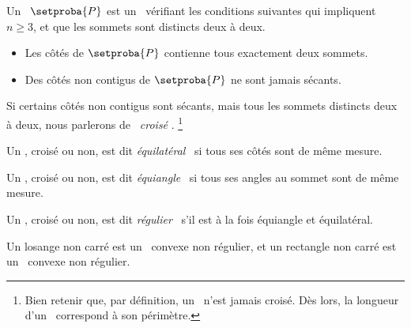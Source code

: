 

\newpage

\begin{defi}
	Un \og \emph{\ngone} \fg\ $\setproba{P}$ est un \ncycle\ vérifiant les conditions suivantes qui impliquent $n \geq 3$, et que les sommets sont distincts deux à deux.
	\begin{itemize}
		\item Les côtés de $\setproba{P}$ contienne tous exactement deux sommets.

		\item Des côtés non contigus de $\setproba{P}$ ne sont jamais sécants.
	\end{itemize}


	Si certains côtés non contigus sont sécants, mais tous les sommets distincts deux à deux, nous parlerons de \og \emph{\ngone\ croisé} \fg.%
	\footnote{
		Bien retenir que, par définition, un \ngone\ n'est jamais croisé.
		Dès lors, la longueur d'un \ngone\ correspond à son périmètre.
	}
\end{defi}


\begin{defi}
	Un \ngone, croisé ou non, est dit \og \emph{équilatéral} \fg\ si tous ses côtés sont de même mesure.
\end{defi}


\begin{defi}
	Un \ngone, croisé ou non, est dit \og \emph{équiangle} \fg\ si tous ses angles au sommet sont de même mesure.
\end{defi}


\begin{defi}
	Un \ngone, croisé ou non, est dit \og \emph{régulier} \fg\ s'il est à la fois équiangle et équilatéral.
\end{defi}


\begin{remark}
	Un losange non carré est un \nequi\ convexe non régulier, et un rectangle non carré est un \niso\ convexe non régulier.
\end{remark}


